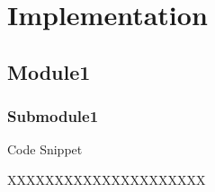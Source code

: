 \chapter{Implementation}

\section{Module1}

\subsection{Submodule1}
Code Snippet

XXXXXXXXXXXXXXXXXXXXX